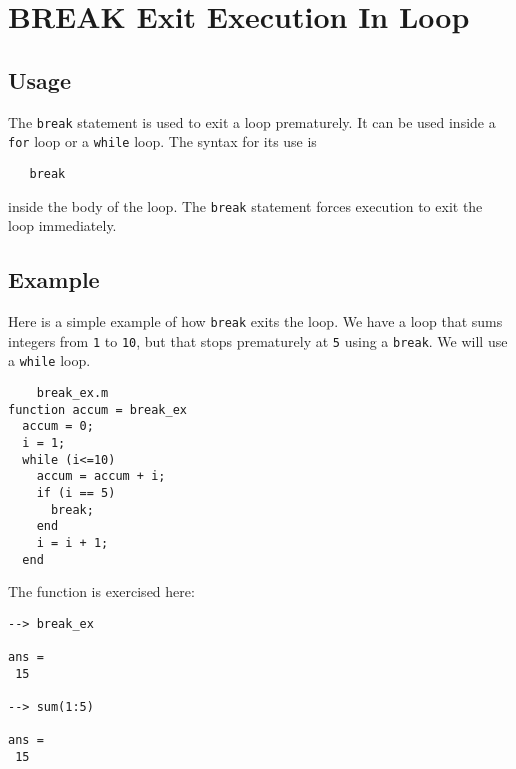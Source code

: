 \section{BREAK Exit Execution In Loop}

\subsection{Usage}

The \verb|break| statement is used to exit a loop prematurely.
It can be used inside a \verb|for| loop or a \verb|while| loop.  The
syntax for its use is
\begin{verbatim}
   break
\end{verbatim}
inside the body of the loop.  The \verb|break| statement forces
execution to exit the loop immediately.
\subsection{Example}

Here is a simple example of how \verb|break| exits the loop.
We have a loop that sums integers from \verb|1| to \verb|10|, but
that stops prematurely at \verb|5| using a \verb|break|.  We will
use a \verb|while| loop.
\begin{verbatim}
    break_ex.m
function accum = break_ex
  accum = 0;
  i = 1;
  while (i<=10)
    accum = accum + i;
    if (i == 5)
      break;
    end
    i = i + 1;
  end
\end{verbatim}
The function is exercised here:
\begin{verbatim}
--> break_ex

ans = 
 15 

--> sum(1:5)

ans = 
 15 
\end{verbatim}
